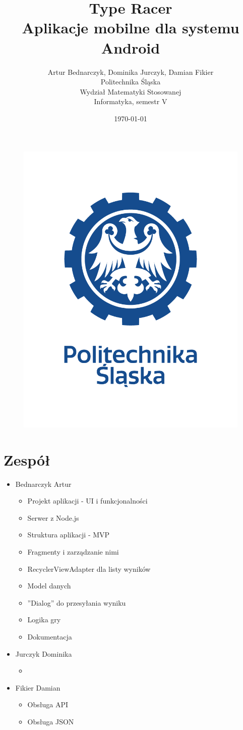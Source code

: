 \documentclass[12pt,a4paper]{article}
\title{Type Racer\\Aplikacje mobilne dla systemu Android}
\author{Artur Bednarczyk, Dominika Jurczyk, Damian Fikier\\Politechnika Śląska\\Wydział Matematyki Stosowanej\\Informatyka, semestr V}
\date{\today}
\begin{document}
	\maketitle
	\begin{figure}[H]
		\centering
		\includegraphics[width=0.5\linewidth]{logo2}
		\label{fig:logo}
	\end{figure}
	\clearpage
	\tableofcontents
	\clearpage
	\section{Zespół}
	\begin{itemize}
	    \item Bednarczyk Artur \begin{itemize}
	        \item Projekt aplikacji - UI i funkcjonalności
	        \item Serwer z Node.js
	        \item Struktura aplikacji - MVP
	        \item Fragmenty i zarządzanie nimi
	        \item RecyclerViewAdapter dla listy wyników
	        \item Model danych
	        \item ''Dialog'' do przesyłania wyniku
	        \item Logika gry
	        \item Dokumentacja
	    \end{itemize}
	    \item Jurczyk Dominika \begin{itemize}
	        \item 
	    \end{itemize}
	    \item Fikier Damian \begin{itemize}
	        \item Obsługa API
	        \item Obsługa JSON
	    \end{itemize}
	\end{itemize}
	\clearpage
\end{document}
